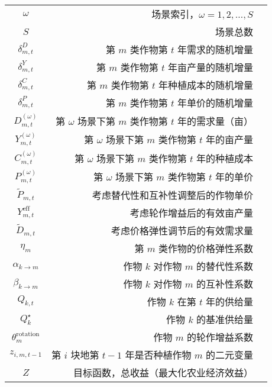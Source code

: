 \begin{table}[htbp]
\begin{tabularx}{\textwidth}{|C|D|U|}
$ \omega $ & 场景索引，$\omega = 1, 2, \dots, S$ \\
$ S $ & 场景总数 \\
$ \delta^{D}_{m,t} $ & 第 $m$ 类作物第 $t$ 年需求的随机增量 \\
$ \delta^{Y}_{m,t} $ & 第 $m$ 类作物第 $t$ 年亩产量的随机增量 \\
$ \delta^{C}_{m,t} $ & 第 $m$ 类作物第 $t$ 年种植成本的随机增量 \\
$ \delta^{P}_{m,t} $ & 第 $m$ 类作物第 $t$ 年单价的随机增量 \\
$ D_{m,t}^{(\omega)} $ & 第 $\omega$ 场景下第 $m$ 类作物第 $t$ 年的需求量（亩） \\
$ Y_{m,t}^{(\omega)} $ & 第 $\omega$ 场景下第 $m$ 类作物第 $t$ 年的亩产量 \\
$ C_{m,t}^{(\omega)} $ & 第 $\omega$ 场景下第 $m$ 类作物第 $t$ 年的种植成本 \\
$ P_{m,t}^{(\omega)} $ & 第 $\omega$ 场景下第 $m$ 类作物第 $t$ 年的单价 \\


$ \tilde{P}_{m,t} $ & 考虑替代性和互补性调整后的作物单价 \\
$ Y_{m,t}^{\text{eff}} $ & 考虑轮作增益后的有效亩产量 \\
$ \tilde{D}_{m,t} $ & 考虑价格弹性调节后的有效需求量 \\
$ \eta_m $ & 第 $m$ 类作物的价格弹性系数 \\
$ \alpha_{k \to m} $ & 作物 $k$ 对作物 $m$ 的替代性系数 \\
$ \beta_{k \to m} $ & 作物 $k$ 对作物 $m$ 的互补性系数 \\
$ Q_{k,t} $ & 作物 $k$ 在第 $t$ 年的供给量 \\
$ Q_k^\star $ & 作物 $k$ 的基准供给量 \\
$ \theta^{\text{rotation}}_m $ & 作物 $m$ 的轮作增益系数 \\
$ z_{i,m,t-1} $ & 第 $i$ 块地第 $t-1$ 年是否种植作物 $m$ 的二元变量 \\

$ Z $ & 目标函数，总收益（最大化农业经济效益） \\

    \hline
  \end{tabularx}
\end{table}


